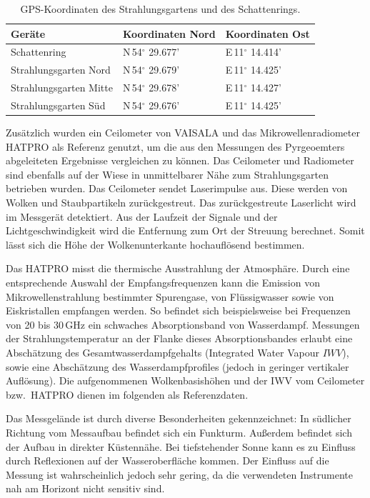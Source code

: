 \documentclass[10pt,a4paper,compsoc,peer review papers]{IEEEtran}
\begin{document}
\begin{table}[ht]
  \centering
  \caption{GPS-Koordinaten des Strahlungsgartens und des Schattenrings.}
  \label{tab:gps}
  \begin{tabular}{l|l|l}
    \textbf{Geräte}        & \textbf{Koordinaten Nord} & \textbf{Koordinaten Ost} \\\hline
    Schattenring           & N\,54$^\circ$ 29.677' & E\,11$^\circ$ 14.414' \\
    Strahlungsgarten Nord  & N\,54$^\circ$ 29.679' & E\,11$^\circ$ 14.425' \\
    Strahlungsgarten Mitte & N\,54$^\circ$ 29.678' & E\,11$^\circ$ 14.427' \\
    Strahlungsgarten Süd   & N\,54$^\circ$ 29.676' & E\,11$^\circ$ 14.425' \\
  \end{tabular}
\end{table}

Zusätzlich wurden ein Ceilometer von VAISALA und das Mikrowellenradiometer
HATPRO als Referenz genutzt, um die aus den Messungen des Pyrgeoemters
abgeleiteten Ergebnisse vergleichen zu können. Das Ceilometer und Radiometer
sind ebenfalls auf der Wiese in unmittelbarer Nähe zum Strahlungsgarten
betrieben wurden. Das Ceilometer sendet Laserimpulse aus. Diese werden von 
Wolken und Staubpartikeln zurückgestreut. Das zurückgestreute Laserlicht wird im 
Messgerät detektiert.  Aus der Laufzeit der Signale und der Lichtgeschwindigkeit 
wird die Entfernung zum Ort der Streuung berechnet. Somit lässt sich die Höhe
der Wolkenunterkante hochauflösend bestimmen.

Das  HATPRO misst die thermische Ausstrahlung der Atmosphäre. Durch eine
entsprechende Auswahl der Empfangsfrequenzen kann die Emission von
Mikrowellenstrahlung bestimmter Spurengase, von Flüssigwasser sowie von
Eiskristallen empfangen werden. So befindet sich beispielsweise bei Frequenzen
von 20 bis 30\,GHz ein schwaches Absorptionsband von Wasserdampf. Messungen der
Strahlungstemperatur an der Flanke dieses Absorptionsbandes erlaubt eine
Abschätzung des Gesamtwasserdampfgehalts (Integrated Water Vapour $IWV$), sowie
eine Abschätzung des Wasserdampfprofiles (jedoch in geringer vertikaler
Auflösung). Die aufgenommenen Wolkenbasishöhen und der IWV vom 
Ceilometer bzw.\ HATPRO dienen im folgenden als Referenzdaten.

Das Messgelände ist durch diverse Besonderheiten gekennzeichnet: In
südlicher Richtung vom Messaufbau befindet sich ein Funkturm. Außerdem befindet
sich der Aufbau in direkter Küstennähe. Bei tiefstehender Sonne kann es zu
Einfluss durch Reflexionen auf der Wasseroberfläche kommen. Der Einfluss auf
die Messung ist wahrscheinlich jedoch sehr gering, da die verwendeten Instrumente
nah am Horizont nicht sensitiv sind.
\end{document}
